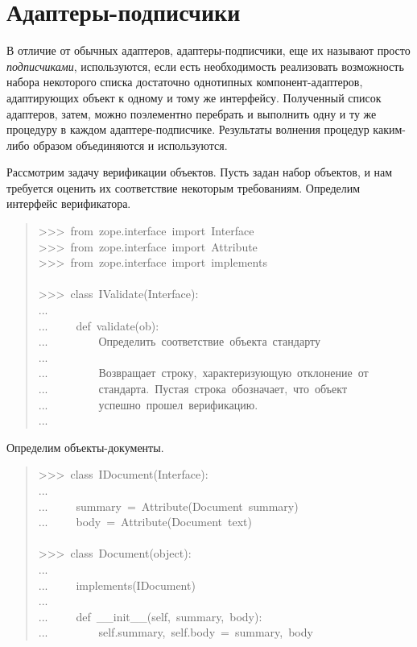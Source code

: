 \documentclass[a4paper,openany,twoside,final]{book}
\providecommand*{\DUroletitlereference}[1]{\textsl{#1}}
\begin{document}
\section{Адаптеры-подписчики%
  \label{id46}%
}

В отличие от обычных адаптеров, адаптеры-подписчики, еще их называют
просто \DUroletitlereference{подписчиками}, используются, если есть необходимость
реализовать возможность набора некоторого списка достаточно однотипных
компонент-адаптеров, адаптирующих объект к одному и тому же
интерфейсу.  Полученный список адаптеров, затем, можно поэлементно
перебрать и выполнить одну и ту же процедуру в каждом
адаптере-подписчике.  Результаты волнения процедур каким-либо образом
объединяются и используются.

Рассмотрим задачу верификации объектов.  Пусть задан набор объектов, и нам
требуется оценить их соответствие некоторым требованиям.  Определим
интерфейс верификатора.

\begin{quote}{\ttfamily \raggedright \noindent
>{}>{}>~from~zope.interface~import~Interface\\
>{}>{}>~from~zope.interface~import~Attribute\\
>{}>{}>~from~zope.interface~import~implements\\
~\\
>{}>{}>~class~IValidate(Interface):\\
...\\
...~~~~~def~validate(ob):\\
...~~~~~~~~~\textquotedbl{}\textquotedbl{}\textquotedbl{}Определить~соответствие~объекта~стандарту\\
...\\
...~~~~~~~~~Возвращает~строку,~характеризующую~отклонение~от\\
...~~~~~~~~~стандарта.~Пустая~строка~обозначает,~что~объект\\
...~~~~~~~~~успешно~прошел~верификацию.\\
...~~~~~~~~~\textquotedbl{}\textquotedbl{}\textquotedbl{}
}
\end{quote}

Определим объекты-документы.

\begin{quote}{\ttfamily \raggedright \noindent
>{}>{}>~class~IDocument(Interface):\\
...\\
...~~~~~summary~=~Attribute(\textquotedbl{}Document~summary\textquotedbl{})\\
...~~~~~body~=~Attribute(\textquotedbl{}Document~text\textquotedbl{})\\
~\\
>{}>{}>~class~Document(object):\\
...\\
...~~~~~implements(IDocument)\\
...\\
...~~~~~def~\_\_init\_\_(self,~summary,~body):\\
...~~~~~~~~~self.summary,~self.body~=~summary,~body
}
\end{quote}
\end{document}
